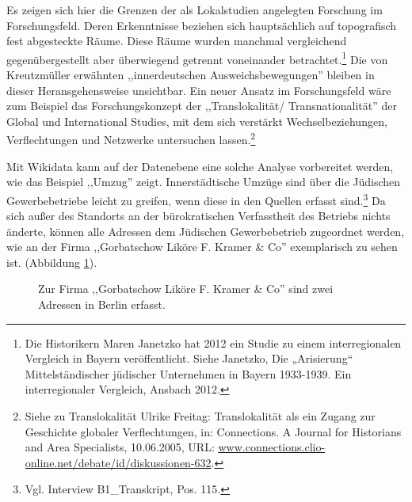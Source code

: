 Es zeigen sich hier die Grenzen der als Lokalstudien angelegten Forschung im Forschungsfeld. Deren Erkenntnisse beziehen sich hauptsächlich auf topografisch fest abgesteckte Räume. Diese Räume wurden manchmal vergleichend gegenübergestellt aber überwiegend getrennt voneinander betrachtet.\footnote{Die Historikern Maren Janetzko hat 2012 ein Studie zu einem interregionalen Vergleich in Bayern veröffentlicht. Siehe Janetzko, Die „Arisierung“ Mittelständischer jüdischer Unternehmen in Bayern 1933-1939. Ein interregionaler Vergleich, Ansbach 2012.} Die von Kreutzmüller erwähnten ,,innerdeutschen Ausweichsbewegungen'' bleiben in dieser Heransgehensweise unsichtbar. Ein neuer Ansatz im Forschungsfeld wäre zum Beispiel das Forschungskonzept der ,,Translokalität/ Transnationalität'' der Global und International Studies, mit dem sich verstärkt Wechselbeziehungen, Verflechtungen und Netzwerke untersuchen lassen.\footnote{Siehe zu Translokalität Ulrike Freitag: Translokalität als ein Zugang zur Geschichte globaler Verflechtungen, in: Connections. A Journal for Historians and Area Specialists, 10.06.2005, URL: \url{www.connections.clio-online.net/debate/id/diskussionen-632}.} 

Mit Wikidata kann auf der Datenebene eine solche Analyse vorbereitet werden, wie das Beispiel ,,Umzug'' zeigt. Innerstädtische Umzüge sind über die Jüdischen Gewerbebetriebe leicht zu greifen, wenn diese in den Quellen erfasst sind.\footnote{Vgl. Interview B1\_Transkript, Pos. 115.} Da sich außer des Standorts an der bürokratischen Verfasstheit des Betriebs nichts änderte, können alle Adressen dem Jüdischen Gewerbebetrieb zugeordnet werden, wie an der Firma ,,Gorbatschow Liköre F. Kramer \& Co'' exemplarisch zu sehen ist. (Abbildung \ref{fig:wikidataaddress}).

\begin{figure}[h]
    \centering
    \caption{Zur Firma ,,Gorbatschow Liköre F. Kramer \& Co'' sind zwei Adressen in Berlin erfasst.}
    \label{fig:wikidataaddress}
\end{figure}


